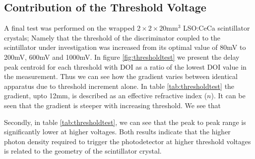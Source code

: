 \subsection{Contribution of the Threshold Voltage}
\label{sec:threshold}
A final test was performed on the wrapped $2\times2\times20$mm$^3$ LSO:CeCa scintillator crystals; Namely that the threshold of the discriminator coupled to the scintillator under investigation was increased from its optimal value of 80mV to 200mV, 600mV and 1000mV. In figure \ref{fig:thresholdtest} we present the delay peak centroid for each threshold with DOI as a ratio of the lowest DOI value in the measurement. Thus we can see how the gradient varies between identical apparatus due to threshold increment alone. In table \ref{tab:thresholdtest} the gradient, upto 12mm, is described as an effective refractive index ($n$). It can be seen that the gradient is steeper with increasing threshold. We see that


Secondly, in table \ref{tab:thresholdtest}, we can see that the peak to peak range is significantly lower at higher voltages. Both results indicate that the higher photon density required to trigger the photodetector at higher threshold voltages is related to the geometry of the scintillator crystal.

